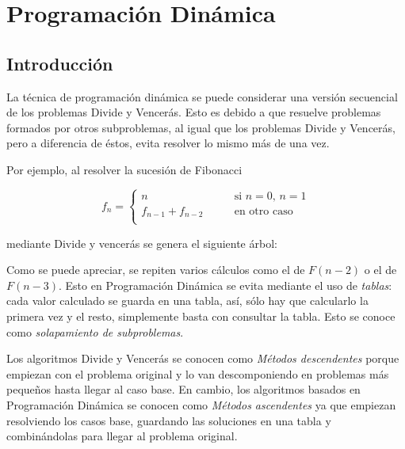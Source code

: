 \documentclass[10pt,a4paper,spanish]{report}
\theoremstyle{definition}
\theoremstyle{remark}
\begin{document}
\chapter{\textcolor{amethyst}Programación Dinámica}

\section{\textcolor{amethyst}Introducción}

La técnica de programación dinámica se puede considerar una versión secuencial de los problemas Divide y Vencerás. Esto es debido a que resuelve problemas formados por otros subproblemas, al igual que los problemas Divide y Vencerás, pero a diferencia de éstos, evita resolver lo mismo más de una vez.

Por ejemplo, al resolver la sucesión de Fibonacci 

\begin{displaymath}
    f_n = \left\{ \begin{array}{ll}
n & \qquad \textrm{si $n = 0$, $n = 1$}\\
f_{n-1} + f_{n-2} & \qquad \textrm{en otro caso} \\
\end{array} \right.
\end{displaymath}


mediante Divide y vencerás se genera el siguiente árbol:

\begin{center}

\end{center}

Como se puede apreciar, se repiten varios cálculos como el de $F(n-2)$ o el de $F(n-3)$. Esto en Programación Dinámica se evita mediante el uso de \textit{\textcolor{amethyst}{tablas}}: cada valor calculado se guarda en una tabla, así, sólo hay que calcularlo la primera vez y el resto, simplemente basta con consultar la tabla. Esto se conoce como \textit{\textcolor{amethyst}{solapamiento de subproblemas}}.

\label{ascendentes}
Los algoritmos Divide y Vencerás se conocen como \textit{\textcolor{amethyst}{Métodos descendentes}} porque empiezan con el problema original y lo van descomponiendo en problemas más pequeños hasta llegar al caso base. En cambio, los algoritmos basados en Programación Dinámica se conocen como \textit{\textcolor{amethyst}{Métodos ascendentes}} ya que empiezan resolviendo los casos base, guardando las soluciones en una tabla y combinándolas para llegar al problema original.
\end{document}
